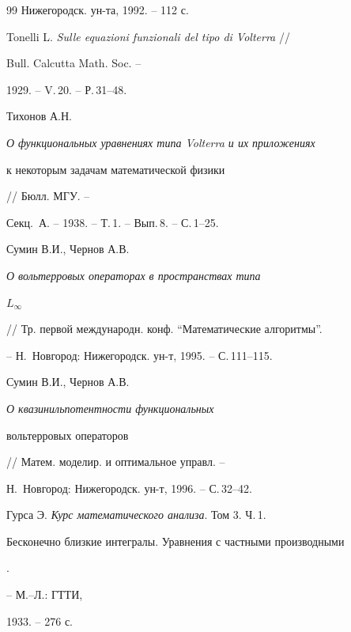 \begin{thebibliography}{99}
Нижегородск. ун-та, 1992. -- 112 с.




Tonelli L. {\em Sulle equazioni funzionali del tipo di Volterra} //


Bull. Calcutta Math. Soc. --


1929. -- V.\,20. -- Р.\,31--48.




Тихонов А.Н. {\em О функциональных уравнениях типа Volterra и их приложениях


к некоторым задачам математической физики} // Бюлл. МГУ. --


Секц.~А. -- 1938. -- Т.\,1. -- Вып.\,8. -- С.\,1--25.




Сумин В.И., Чернов А.В. {\em О вольтерровых операторах в пространствах типа 


$L_{\infty}$} // Тр. первой международн. конф. ``Математические алгоритмы''.


-- Н.~Новгород: Нижегородск. ун-т, 1995. -- С.\,111--115.




Сумин В.И., Чернов А.В. {\em О квазинильпотентности функциональных


вольтерровых операторов} // Матем. моделир. и оптимальное управл. --


Н.~Новгород: Нижегородск. ун-т, 1996. -- С.\,32--42.




Гурса Э. {\em Курс математического анализа}. Том 3. Ч.\,1. {\em


Бесконечно близкие интегралы. Уравнения с частными производными}.


-- М.--Л.: ГТТИ,


1933. -- 276 с.





\end{thebibliography}





\vskip 2cm













\label{end}





